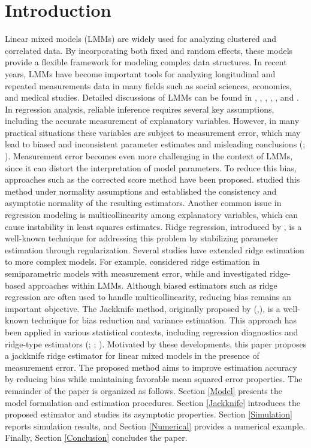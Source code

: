 \documentclass[twoside]{article}
\begin{document}
\section{Introduction}
Linear mixed models (LMMs) are widely used for analyzing clustered and correlated data. By incorporating both fixed and random effects, these models provide a flexible framework for modeling complex data structures. In recent years, LMMs have become important tools for analyzing longitudinal and repeated measurements data in many fields such as social sciences, economics, and medical studies. Detailed discussions of LMMs can be found in \cite{DL94}, \cite{Davidian:Giltian:1995}, \cite{ZW00}, \cite{Zare:Rasekh:2011}, \cite{Demidenko:2013}, and \cite{Neuhaus:McCulloch:2014}.
In regression analysis, reliable inference requires several key assumptions, including the accurate measurement of explanatory variables. However, in many practical situations these variables are subject to measurement error, which may lead to biased and inconsistent parameter estimates and misleading conclusions (\cite{Stefanski:1985}; \cite{Fuller:1987}). Measurement error becomes even more challenging in the context of LMMs, since it can distort the interpretation of model parameters. To reduce this bias, approaches such as the corrected score method have been proposed. \cite{ZF02} studied this method under normality assumptions and established the consistency and asymptotic normality of the resulting estimators.
Another common issue in regression modeling is multicollinearity among explanatory variables, which can cause instability in least squares estimates. Ridge regression, introduced by \cite{Hoerl:Kennard:1970}, is a well-known technique for addressing this problem by stabilizing parameter estimation through regularization. Several studies have extended ridge estimation to more complex models. For example, \cite{Emami:2018} considered ridge estimation in semiparametric models with measurement error, while \cite{Özkale:Can:2017} and \cite{YR22} investigated ridge-based approaches within LMMs. Although biased estimators such as ridge regression are often used to handle multicollinearity, reducing bias remains an important objective. The Jackknife method, originally proposed by (\cite{Quenouille:1949},\cite{Quenouille:1956}), is a well-known technique for bias reduction and variance estimation. This approach has been applied in various statistical contexts, including regression diagnostics \cite{Cook:1977} and ridge-type estimators (\cite{Nomura:1988}; \cite{Nyquist:1988}; \cite{Özkale:Kuran:2019}).
Motivated by these developments, this paper proposes a jackknife ridge estimator for linear mixed models in the presence of measurement error. The proposed method aims to improve estimation accuracy by reducing bias while maintaining favorable mean squared error properties.
The remainder of the paper is organized as follows. Section \ref{Model} presents the model formulation and estimation procedures.
 Section \ref{Jackknife} introduces the proposed estimator and studies its asymptotic properties. Section \ref{Simulation} reports simulation results, and Section \ref{Numerical} provides a numerical example. Finally, Section \ref{Conclusion} concludes the paper.
\end{document}
